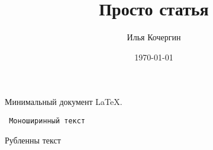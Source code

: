 \documentclass{article}
\author{Илья Кочергин}
\date{\today}
\title{Просто статья}
\begin{document}
\maketitle
Минимальный документ \LaTeX.

{ \tt
	Моноширинный текст
	}

{ \sffamily
	Рубленны текст
}
\end{document}
